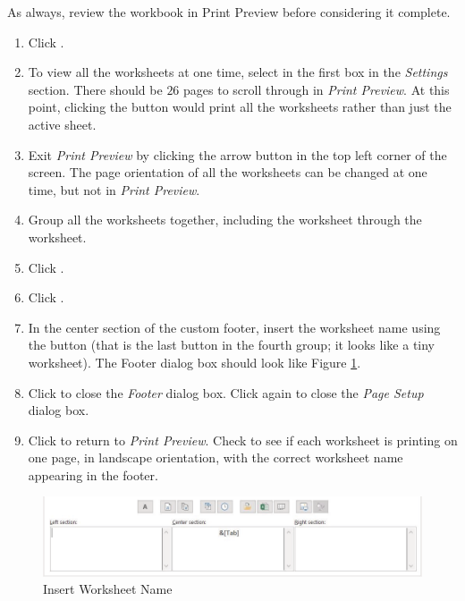 As always, review the workbook in Print Preview before considering it complete.

\begin{enumbox}
	\begin{enumerate}
		\item Click .
		\item To view all the worksheets at one time, select  in the first box in the \textit{Settings} section. There should be $ 26 $ pages to scroll through in \textit{Print Preview}. At this point, clicking the  button would print all the worksheets rather than just the active sheet.
		\item Exit \textit{Print Preview} by clicking the arrow button in the top left corner of the screen. The page orientation of all the worksheets can be changed at one time, but not in \textit{Print Preview}.
		\item Group all the worksheets together, including the  worksheet through the  worksheet.
		\item Click .
		\item Click .
		\item In the center section of the custom footer, insert the worksheet name using the  button (that is the last button in the fourth group; it looks like a tiny worksheet). The Footer dialog box should look like Figure \ref{06:fig15}.
		\item Click  to close the \textit{Footer} dialog box. Click  again to close the \textit{Page Setup} dialog box.
		\item Click  to return to \textit{Print Preview}. Check to see if each worksheet is printing on one page, in landscape orientation, with the correct worksheet name appearing in the footer.
	\end{enumerate}
\end{enumbox}
	
\begin{figure}[H]
	\centering
	\includegraphics[width=\maxwidth{.95\linewidth}]{gfx/ch06_fig15}
	\caption{Insert Worksheet Name}
	\label{06:fig15}
\end{figure}

